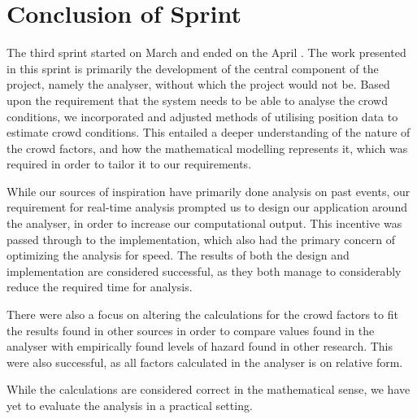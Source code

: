 \section{Conclusion of Sprint}
The third sprint started on March  and ended on the April . The work presented in this sprint is primarily the development of the central component of the project, namely the analyser, without which the project would not be. Based upon the requirement that the system needs to be able to analyse the crowd conditions, we incorporated and adjusted methods of utilising position data to estimate crowd conditions. This entailed a deeper understanding of the nature of the crowd factors, and how the mathematical modelling represents it, which was required in order to tailor it to our requirements.

While our sources of inspiration have primarily done analysis on past events, our requirement for real-time analysis prompted us to design our application around the analyser, in order to increase our computational output. This incentive was passed through to the implementation, which also had the primary concern of optimizing the analysis for speed. The results of both the design and implementation are considered successful, as they both manage to considerably reduce the required time for analysis.

There were also a focus on altering the calculations for the crowd factors to fit the results found in other sources in order to compare values found in the analyser with empirically found levels of hazard found in other research. This were also successful, as all factors calculated in the analyser is on relative form.

While the calculations are considered correct in the mathematical sense, we have yet to evaluate the analysis in a practical setting.